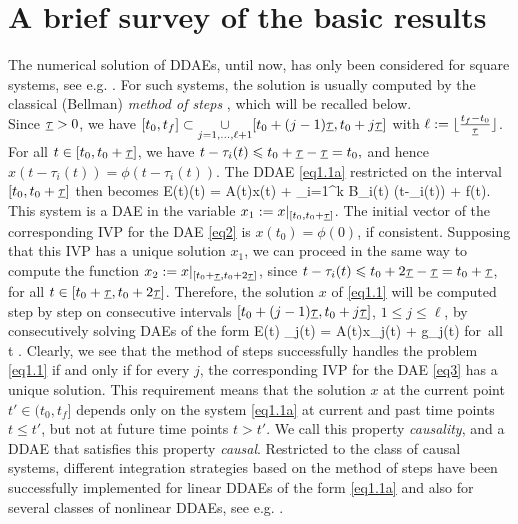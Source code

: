 \documentclass[final,reqno]{siamltex}
\begin{document}
\section{A brief survey of the basic results}
%
The numerical solution of DDAEs, until now, has only been considered for square systems, see e.g. 
\cite{AscP95,BakPT02,CamL09,GugH07,Liu99,ShaG06,TiaYK11,ZhuP97,ZhuP98}. 
For such systems, the solution is usually computed by the classical (Bellman) \emph{method of steps} \cite{Bel61,BelC63,BelC65}, which will be recalled below.\\
Since $\underline{\tau}>0$, we have $[t_0,t_f] \subset \underset{j=1,\dots,\ell+1}{\cup} [t_0+(j-1)\underline{\tau},t_0+j\underline{\tau}]$ 
with $\ell := \lfloor \frac{t_f-t_0}{\underline{\tau}} \rfloor$.
For all $t \in [t_0,t_0+\underline{\tau}]$, we have $t-\tau_i(t) \leqslant t_0 + \underline{\tau} - \underline{\tau} = t_0,$ and hence $x(t-\tau_i(t)) = \phi(t-\tau_i(t))$.
The DDAE \eqref{eq1.1a} restricted on the interval $[t_0,t_0+\underline{\tau}]$ then becomes
%
\be\label{eq2}
 E(t)(t) = A(t)x(t) + \sum_{i=1}^k B_i(t) \phi(t-\tau_i(t)) + f(t).
\ee
% 
This system is a DAE in the variable $x_1 := x|_{[t_0,t_0+\underline{\tau}]}$. The initial vector of the corresponding IVP for the DAE \eqref{eq2} is $x(t_0)=\phi(0)$, if consistent.
Supposing that this IVP has a unique solution $x_1$, we can proceed in the same way to compute the function $x_2 := x|_{[t_0+\underline{\tau},t_0+2\underline{\tau}]}$, since 
$t-\tau_i(t) \leqslant t_0 + 2 \underline{\tau} - \underline{\tau} = t_0+\underline{\tau}$, for all $t\in [t_0+\underline{\tau},t_0+2\underline{\tau}]$. Therefore, the solution $x$ of \eqref{eq1.1} will be 
computed step by step on consecutive intervals $[t_0+(j-1)\underline{\tau},t_0+j\underline{\tau}]$, $1\leq j\leq \ell$, by consecutively solving DAEs of the form
%
\be\label{eq3}
 E(t) _j(t) = A(t)x_j(t) + g_j(t) \quad \mbox{for all } t .
\ee
%
Clearly, we see that the method of steps successfully handles the problem \eqref{eq1.1} if and only if for every $j$, the corresponding IVP for the 
DAE \eqref{eq3} has a unique solution.
This requirement means that the solution $x$ at the current point $t'\in(t_0,t_f]$ depends only on the system \eqref{eq1.1a} 
at current and past time points $t \leq t'$, but not at future time points $t > t'$. We call this property \emph{causality}, and 
a DDAE that satisfies this property \emph{causal}. 
Restricted to the class of causal systems, different integration strategies based on the method of steps have been successfully implemented for 
linear DDAEs of the form \eqref{eq1.1a} and also for several classes of nonlinear DDAEs, see e.g. \cite{AscP95,BakPT02,GugH07,Hau97,ShaG06}.
\end{document}
